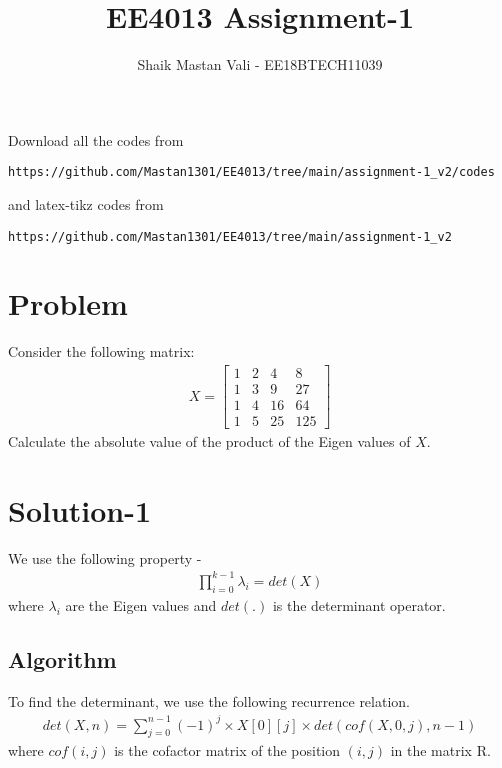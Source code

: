\documentclass[journal,12pt,twocolumn]{IEEEtran}
\begin{document}
     \def\rightbox#1{\makebox[0in][r]{#1}}
     \def\centbox#1{\makebox[0in]{#1}}
     \def\topbox#1{\raisebox{-\baselineskip}[0in][0in]{#1}}
     \def\midbox#1{\raisebox{-0.5\baselineskip}[0in][0in]{#1}}
\vspace{3cm}
\title{EE4013 Assignment-1}
\author{Shaik Mastan Vali - EE18BTECH11039}
\maketitle
\newpage
\bigskip
\renewcommand{\thefigure}{\theenumi}
\renewcommand{\thetable}{\theenumi}
Download all the codes from 
\begin{lstlisting}
https://github.com/Mastan1301/EE4013/tree/main/assignment-1_v2/codes
\end{lstlisting}
%
and latex-tikz codes from 
%
\begin{lstlisting}
https://github.com/Mastan1301/EE4013/tree/main/assignment-1_v2
\end{lstlisting}

\section{Problem}
Consider the following matrix:
\begin{align*}
    X = \begin{bmatrix}
        1 & 2 & 4 & 8 \\
        1 & 3 & 9 & 27 \\
        1 & 4 & 16 & 64 \\
        1 & 5 & 25 & 125
    \end{bmatrix}
\end{align*}
Calculate the absolute value of the product of the Eigen values of $X$.

\section{\textbf{Solution-1}}
We use the following property -
\begin{align*}
    \prod_{i = 0}^{k - 1} \lambda_{i} = det(X)
\end{align*}
where $\lambda_{i}$ are the Eigen values and $det(.)$ is the determinant operator. 
\subsection{Algorithm}
To find the determinant, we use the following recurrence relation.
\begin{align*}
    det(X, n) = \sum_{j = 0}^{n - 1} (-1) ^ {j} \times X[0][j] \times det(cof(X, 0, j), n - 1)
\end{align*}
where $cof(i, j)$ is the cofactor matrix of the position $(i, j)$ in the matrix R. \\ \\
\end{document}
